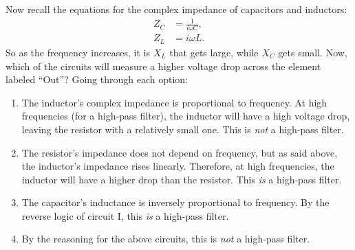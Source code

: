 \documentclass[11pt]{paper}
\begin{document}
Now recall the equations for the complex impedance of capacitors and inductors:
\begin{align}
Z_C &= \frac{1}{i\omega C},\\
Z_L &= i\omega L.
\end{align}
So as the frequency increases, it is $X_L$ that gets large, while $X_C$ gets small.  Now, which of the circuits will measure a higher voltage drop across the element labeled ``Out''?  Going through each option:
\begin{enumerate}[label=\Roman*.]
\item The inductor's complex impedance is proportional to frequency.  At high frequencies (for a high-pass filter), the inductor will have a high voltage drop, leaving the resistor with a relatively small one.  This is \emph{not} a high-pass filter.\\
\item The resistor's impedance does not depend on frequency, but as said above, the inductor's impedance rises linearly.  Therefore, at high frequencies, the inductor will have a higher drop than the resistor.  This \emph{is} a high-pass filter.\\
\item The capacitor's inductance is inversely proportional to frequency.  By the reverse logic of circuit I, this \emph{is} a high-pass filter.\\
\item By the reasoning for the above circuits, this is \emph{not} a high-pass filter.
\end{enumerate}
\end{document}
